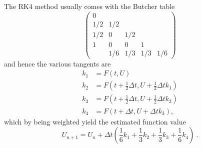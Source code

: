 The RK4 method usually comes with the Butcher table
\begin{equation}
  \begin{pmatrix}
    0 &&&\\
    1/2 & 1/2 & & \\
    1/2 & 0 & 1/2 & \\
    1 & 0 & 0 & 1  \\
    & 1/6 & 1/3 & 1/3 & 1/6
  \end{pmatrix}
\end{equation}
and hence the various tangents are
\begin{align}
  k_1 &= F(t, U) \\
  k_2 &= F(t + \frac{1}{2} \Delta t, U + \frac{1}{2} \Delta t k_1) \\
  k_3 &= F(t + \frac{1}{2} \Delta t, U + \frac{1}{2} \Delta t k_2 ) \\
  k_4 &= F(t + \Delta t, U + \Delta t k_3),
\end{align}
which by being weighted yield the estimated function value
\begin{equation}
  U_{n+1} = U_n + \Delta t \left(\frac{1}{6} k_1 + \frac{1}{3} k_2 + \frac{1}{3} k_3 + \frac{1}{6} k_4 \right)~.
\end{equation}
